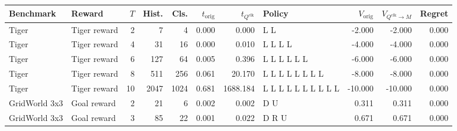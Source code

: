 \begin{tabular}{llrrrrrp{3.2cm}rrr}
\toprule
Benchmark & Reward & $T$ & Hist. & Cls. & $t_{\mathrm{orig}}$ & $t_{Q^{\mathrm{clk}}}$ & Policy & $V_{\mathrm{orig}}$ & $V_{Q^{\mathrm{clk}}\rightarrow M}$ & Regret\\
\midrule
Tiger & Tiger reward & 2 & 7 & 4 & 0.000 & 0.000 & L L & -2.000 & -2.000 & 0.000\\
Tiger & Tiger reward & 4 & 31 & 16 & 0.000 & 0.010 & L L L L & -4.000 & -4.000 & 0.000\\
Tiger & Tiger reward & 6 & 127 & 64 & 0.005 & 0.396 & L L L L L L & -6.000 & -6.000 & 0.000\\
Tiger & Tiger reward & 8 & 511 & 256 & 0.061 & 20.170 & L L L L L L L L & -8.000 & -8.000 & 0.000\\
Tiger & Tiger reward & 10 & 2047 & 1024 & 0.681 & 1688.184 & L L L L L L L L L L & -10.000 & -10.000 & 0.000\\
GridWorld 3x3 & Goal reward & 2 & 21 & 6 & 0.002 & 0.002 & D U & 0.311 & 0.311 & 0.000\\
GridWorld 3x3 & Goal reward & 3 & 85 & 22 & 0.001 & 0.022 & D R U & 0.671 & 0.671 & 0.000\\
\bottomrule
\end{tabular}